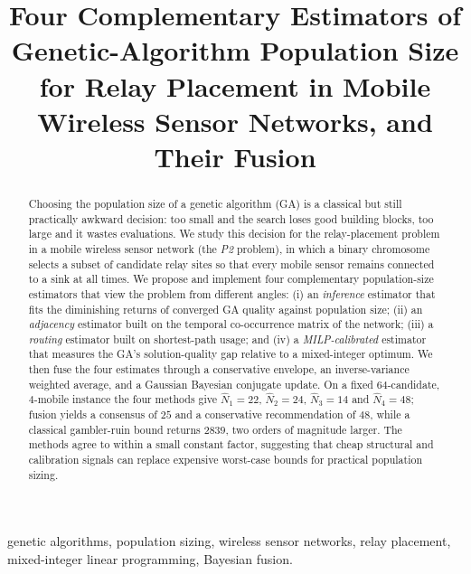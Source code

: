 \documentclass[conference]{IEEEtran}
\newcommand{\Nhat}{\hat{N}}
\begin{document}
\title{Four Complementary Estimators of Genetic-Algorithm Population Size
for Relay Placement in Mobile Wireless Sensor Networks, and Their Fusion}

\author{%
}

\maketitle

\begin{abstract}
Choosing the population size of a genetic algorithm (GA) is a classical but
still practically awkward decision: too small and the search loses good
building blocks, too large and it wastes evaluations. We study this decision for
the relay-placement problem in a mobile wireless sensor network (the
\emph{P2} problem), in which a binary chromosome selects a subset of candidate
relay sites so that every mobile sensor remains connected to a sink at all
times. We propose and implement four complementary population-size estimators
that view the problem from different angles: (i) an \emph{inference} estimator
that fits the diminishing returns of converged GA quality against population
size; (ii) an \emph{adjacency} estimator built on the temporal co-occurrence
matrix of the network; (iii) a \emph{routing} estimator built on
shortest-path usage; and (iv) a \emph{MILP-calibrated} estimator that measures
the GA's solution-quality gap relative to a mixed-integer optimum. We then fuse
the four estimates through a conservative envelope, an inverse-variance
weighted average, and a Gaussian Bayesian conjugate update. On a fixed
$64$-candidate, $4$-mobile instance the four methods give
$\Nhat_1{=}22$, $\Nhat_2{=}24$, $\Nhat_3{=}14$ and $\Nhat_4{=}48$; fusion yields
a consensus of $25$ and a conservative recommendation of $48$, while a classical
gambler-ruin bound returns $2839$, two orders of magnitude larger. The methods
agree to within a small constant factor, suggesting that cheap structural and
calibration signals can replace expensive worst-case bounds for practical
population sizing.
\end{abstract}

\begin{IEEEkeywords}
genetic algorithms, population sizing, wireless sensor networks, relay
placement, mixed-integer linear programming, Bayesian fusion.
\end{IEEEkeywords}
\end{document}
